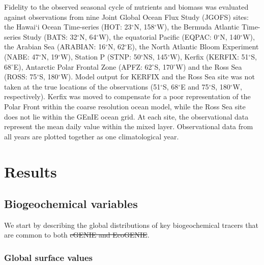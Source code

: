 \documentclass[gmd, manuscript]{copernicus}
\providecommand{\DIFadd}[1]{{\protect\color{blue}\uwave{#1}}} %
\providecommand{\DIFdel}[1]{{\protect\color{red}\sout{#1}}}                      %
\providecommand{\DIFaddbegin}{} %
\providecommand{\DIFaddend}{} %
\providecommand{\DIFdelbegin}{} %
\providecommand{\DIFdelend}{} %
\begin{document}
Fidelity to the observed seasonal cycle of nutrients and biomass was evaluated against observations from nine Joint Global Ocean Flux Study (JGOFS) sites: the Hawai$\!$`i Ocean Time-series (HOT: 23$^\circ$N, 158$^\circ$W), the Bermuda Atlantic Time-series Study (BATS: 32$^\circ$N, 64$^\circ$W), the equatorial Pacific (EQPAC: 0$^\circ$N, 140$^\circ$W), the Arabian Sea (ARABIAN: 16$^\circ$N, 62$^\circ$E), the North Atlantic Bloom Experiment (NABE: 47$^\circ$N, 19$^\circ$W), Station P (STNP: 50$^\circ$NS, 145$^\circ$W), Kerfix (KERFIX: 51$^\circ$S, 68$^\circ$E), Antarctic Polar Frontal Zone (APFZ: 62$^\circ$S, 170$^\circ$W) and the Ross Sea (ROSS: 75$^\circ$S, 180$^\circ$W). Model output for KERFIX and the Ross Sea site was not taken at the true locations of the observations (51$^\circ$S, 68$^\circ$E and 75$^\circ$S, 180$^\circ$W, respectively). Kerfix was moved to compensate for a poor representation of the Polar Front within the coarse resolution ocean model, while the Ross Sea site does not lie within the GEnIE ocean grid. At each site, the observational data represent the mean daily value within the mixed layer. Observational data from all years are plotted together as one climatological year.

\section{Results}\label{Results}

\subsection{Biogeochemical variables}

We start by describing the global distributions of key biogeochemical tracers that are common to both \DIFdelbegin \DIFdel{cGENIE and EcoGENIE}\DIFdelend \DIFaddbegin \DIFadd{cGEnIE and EcoGEnIE}\DIFaddend .

\subsubsection{Global surface values}
\end{document}
